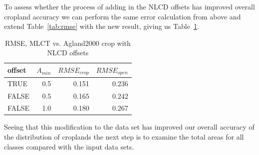 To assess whether the process of adding in the NLCD offsets has
improved overall cropland accuracy we can perform the same error
calculation from above and extend Table~\ref{tab:rmse} with the new
result, giving us Table~\ref{tab:rmse2}.

\begin{table}[ht]
\begin{center}
\begin{tabular}{lrrr}
  \hline
offset & $A_{min}$ & $RMSE_{crop}$ & $RMSE_{open}$ \\ 
  \hline
TRUE & 0.5 & 0.151 & 0.236 \\ 
  FALSE & 0.5 & 0.165 & 0.242 \\ 
  FALSE & 1.0 & 0.180 & 0.267 \\ 
   \hline
\end{tabular}
\caption{RMSE, MLCT vs. Agland2000 crop with NLCD offsets}
\label{tab:rmse2}
\end{center}
\end{table}


Seeing that this modification to the data set has improved our overall
accuracy of the distribution of croplands the next step is to examine
the total areas for all classes compared with the input data sets.  


